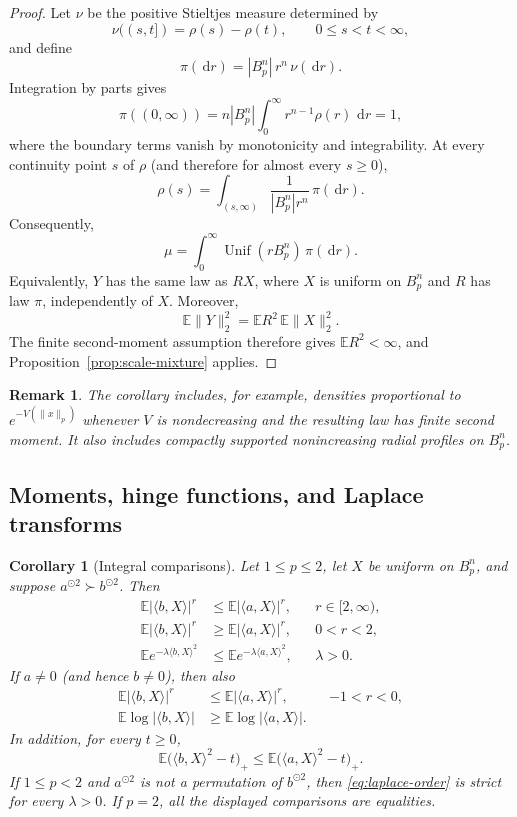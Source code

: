 \documentclass[pdflatex,sn-mathphys-num]{sn-jnl}
\numberwithin{equation}{section}
\theoremstyle{thmstyleone}
\newtheorem{corollary}[theorem]{Corollary}
\theoremstyle{thmstylethree}
\newtheorem{remark}[theorem]{Remark}
\newcommand{\E}{\mathbb{E}}
\newcommand{\1}{\mathbf{1}}
\newcommand{\dd}{\,\mathrm{d}}
\newcommand{\sqvec}[1]{#1^{\odot 2}}
\begin{document}
\begin{proof}
Let $\nu$ be the positive Stieltjes measure determined by
\[
 \nu((s,t])=\rho(s)-\rho(t),
 \qquad 0\le s<t<\infty,
\]
and define
\[
 \pi(\dd r)=|B_p^n|\,r^n\,\nu(\dd r).
\]
Integration by parts gives
\[
 \pi((0,\infty))
 =
 n|B_p^n|\int_0^\infty r^{n-1}\rho(r)\,\dd r
 =1,
\]
where the boundary terms vanish by monotonicity and integrability.
At every continuity point $s$ of $\rho$ (and therefore for almost
every $s\ge0$),
\[
 \rho(s)
 =
 \int_{(s,\infty)}
 \frac{1}{|B_p^n|r^n}\,\pi(\dd r).
\]
Consequently,
\[
 \mu
 =
 \int_0^\infty \operatorname{Unif}(rB_p^n)\,\pi(\dd r).
\]
Equivalently, $Y$ has the same law as $RX$, where $X$ is uniform on
$B_p^n$ and $R$ has law $\pi$, independently of $X$. Moreover,
\[
 \E\|Y\|_2^2=\E R^2\,\E\|X\|_2^2.
\]
The finite second-moment assumption therefore gives $\E R^2<\infty$,
and Proposition~\ref{prop:scale-mixture} applies.
\end{proof}

\begin{remark}
The corollary includes, for example, densities proportional to
$e^{-V(\|x\|_p)}$ whenever $V$ is nondecreasing and the resulting law
has finite second moment. It also includes compactly supported
nonincreasing radial profiles on $B_p^n$.
\end{remark}

\subsection{Moments, hinge functions, and Laplace transforms}

\begin{corollary}[Integral comparisons]\label{cor:moments-laplace}
Let $1\le p\le2$, let $X$ be uniform on $B_p^n$, and suppose
$\sqvec a\succ\sqvec b$. Then
\begin{align}
 \E|\langle b,X\rangle|^r
 &\le
 \E|\langle a,X\rangle|^r,
 && r\in[2,\infty),\label{eq:moment-convex}\\
 \E|\langle b,X\rangle|^r
 &\ge
 \E|\langle a,X\rangle|^r,
 && 0<r<2,\label{eq:moment-concave}\\
 \E e^{-\lambda\langle b,X\rangle^2}
 &\le
 \E e^{-\lambda\langle a,X\rangle^2},
 && \lambda>0.\label{eq:laplace-order}
\end{align}
If $a\ne0$ (and hence $b\ne0$), then also
\begin{align}
 \E|\langle b,X\rangle|^r
 &\le
 \E|\langle a,X\rangle|^r,
 && -1<r<0,\label{eq:negative-moment}\\
 \E\log|\langle b,X\rangle|
 &\ge
 \E\log|\langle a,X\rangle|.\label{eq:log-moment}
\end{align}
In addition, for every $t\ge0$,
\[
 \E\bigl(\langle b,X\rangle^2-t\bigr)_+
 \le
 \E\bigl(\langle a,X\rangle^2-t\bigr)_+.
\]
If $1\le p<2$ and $\sqvec a$ is not a permutation of
$\sqvec b$, then \eqref{eq:laplace-order} is strict for every
$\lambda>0$. If $p=2$, all the displayed comparisons are equalities.
\end{corollary}
\end{document}
